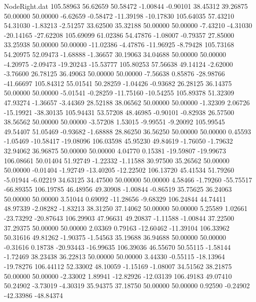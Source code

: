 \begin{filecontents}{NodeRight.dat}
 105.58963   56.62659   50.58472    -1.00844   -0.90101   38.45312   39.26875   50.00000   50.00000   -6.62659   -0.58472  -11.39198  -10.17830
 105.64035   57.43210   54.31030    -1.83213   -2.51257   33.62500   35.32188   50.00000   50.00000   -7.43210   -4.31030  -20.14165  -27.62208
 105.69099   61.02386   54.47876    -1.08007   -0.79357   27.85000   33.25938   50.00000   50.00000  -11.02386   -4.47876  -11.96925   -8.79428
 105.73168   54.20975   52.09473    -1.68888   -1.36657   30.19063   34.04688   50.00000   50.00000   -4.20975   -2.09473  -19.20243  -15.53777
 105.80253   57.56638   49.14124    -2.62000   -3.76600   26.78125   36.49063   50.00000   50.00000   -7.56638    0.85876  -28.98766  -41.66697
 105.84312   55.01541   50.28259    -1.04426   -0.93682   26.28125   36.14375   50.00000   50.00000   -5.01541   -0.28259  -11.75160  -10.54255
 105.89378   51.32309   47.93274    -1.36657   -3.44369   28.52188   38.06562   50.00000   50.00000   -1.32309    2.06726  -15.19921  -38.30135
 105.94431   53.57208   48.46985    -0.90101   -0.82938   26.57500   38.56562   50.00000   50.00000   -3.57208    1.53015   -9.99551   -9.20092
 105.99545   49.54407   51.05469    -0.93682   -1.68888   28.86250   36.56250   50.00000   50.00000    0.45593   -1.05469  -10.58417  -19.08096
 106.03598   45.95230   49.84619    -1.76050   -1.79632   32.94062   36.96875   50.00000   50.00000    4.04770    0.15381  -19.59807  -19.99673
 106.08661   50.01404   51.92749    -1.22332   -1.11588   30.97500   35.26562   50.00000   50.00000   -0.01404   -1.92749  -13.40205  -12.22502
 106.13720   45.41534   51.79260    -5.01944   -6.02219   34.63125   34.47500   50.00000   50.00000    4.58466   -1.79260  -55.75517  -66.89355
 106.19785   46.48956   49.30908    -1.00844   -0.86519   35.75625   36.24063   50.00000   50.00000    3.51044    0.69092  -11.28656   -9.68329
 106.24844   44.74411   48.97339    -2.08282   -1.83213   38.31250   37.14062   50.00000   50.00000    5.25589    1.02661  -23.73292  -20.87643
 106.29903   47.96631   49.20837    -1.11588   -1.00844   37.22500   37.29375   50.00000   50.00000    2.03369    0.79163  -12.60462  -11.39104
 106.33962   50.31616   49.81262    -1.90375   -1.54563   35.19688   36.94688   50.00000   50.00000   -0.31616    0.18738  -20.93443  -16.99635
 106.39036   46.55670   50.55115    -1.58144   -1.72469   38.23438   36.22813   50.00000   50.00000    3.44330   -0.55115  -18.13964  -19.78276
 106.44112   52.33002   48.10059    -1.15169   -1.08007   34.51562   38.21875   50.00000   50.00000   -2.33002    1.89941  -12.82926  -12.03139
 106.49183   49.07410   50.24902    -3.73019   -4.30319   35.94375   37.18750   50.00000   50.00000    0.92590   -0.24902  -42.33986  -48.84374

\end{filecontents}
